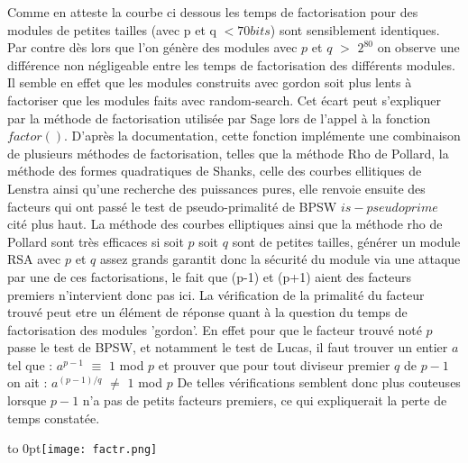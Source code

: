\documentclass[a4paper,11pt]{article}
\begin{document}
Comme en atteste la courbe ci dessous les temps de factorisation pour des modules de petites tailles (avec p et q $ < 70 bits$) sont sensiblement identiques. Par contre dès lors que l'on génère des modules avec $p$ et $q$  $>$ $2^{80}$ on observe une différence non négligeable entre les temps de factorisation des différents modules. Il semble en effet que les modules construits avec gordon soit plus lents à factoriser que les modules faits avec random-search. Cet écart peut s'expliquer par la méthode de factorisation utilisée par Sage lors de l'appel à la fonction $factor()$. D'après la documentation, cette fonction implémente une combinaison de plusieurs méthodes de factorisation, telles que la méthode Rho de Pollard, la méthode des formes quadratiques de Shanks, celle des courbes ellitiques de Lenstra ainsi qu'une recherche des puissances pures, elle renvoie ensuite des facteurs qui ont passé le test de pseudo-primalité de BPSW $is-pseudoprime$ cité plus haut. La méthode des courbes elliptiques ainsi que la méthode rho de Pollard sont très efficaces si soit $p$ soit $q$ sont de petites tailles, générer un module RSA avec $p$ et $q$ assez grands garantit donc la sécurité du module via une attaque par une de ces factorisations, le fait que (p-1) et (p+1) aient des facteurs premiers n'intervient donc pas ici. La vérification de la primalité du facteur trouvé peut etre un élément de réponse quant à la question du temps de factorisation des modules 'gordon'. En effet pour que le facteur trouvé noté $p$ passe le test de BPSW, et notamment le test de Lucas, il faut trouver un entier $a$ tel que : \newline \smallbreak
$a^{p-1} $ $\equiv$ $ 1$ mod $p $ \newline
et prouver que pour tout diviseur premier $q$ de $p-1$ on ait :  \newline \smallbreak
$ a^{(p-1)/q} $ $\ne$ $1$ mod $p$ \newline
De telles vérifications semblent donc plus couteuses lorsque $p-1$ n'a pas de petits facteurs premiers, ce qui expliquerait la perte de temps constatée.



\hfill\hbox to 0pt{\hss\texttt{[image: factr.png]}\hss}\hfill\null
\end{document}
